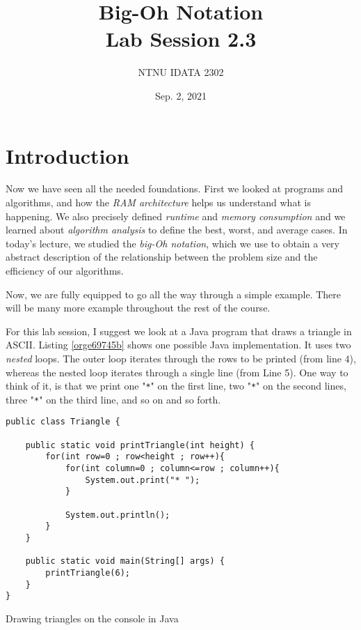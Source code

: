 \documentclass[11pt]{article}
\author{NTNU IDATA 2302}
\date{Sep. 2, 2021}
\title{Big-Oh Notation\\\medskip
\large Lab Session 2.3}
\begin{document}
\maketitle
\tableofcontents


\section{Introduction}
\label{sec:org06c48dc}

Now we have seen all the needed foundations. First we looked at
programs and algorithms, and how the \emph{RAM architecture} helps us
understand what is happening. We also precisely defined \emph{runtime} and
\emph{memory consumption} and we learned about \emph{algorithm analysis} to
define the best, worst, and average cases. In today's lecture, we
studied the \emph{big-Oh notation}, which we use to obtain a very abstract
description of the relationship between the problem size and the
efficiency of our algorithms.

Now, we are fully equipped to go all the way through a simple
example. There will be many more example throughout the rest of the
course.

For this lab session, I suggest we look at a Java program that draws a
triangle in ASCII. Listing \ref{orge69745b} shows one possible Java
implementation. It uses two \emph{nested} loops. The outer loop iterates
through the rows to be printed (from line 4), whereas the nested
loop iterates through a single line (from Line 5). One way to
think of it, is that we print one "\texttt{*}" on the first line, two "\texttt{*}"
on the second lines, three "\texttt{*}" on the third line, and so on and so
forth.

\begin{listing}[htbp]
\begin{verbatim}
public class Triangle {

    public static void printTriangle(int height) {
        for(int row=0 ; row<height ; row++){
            for(int column=0 ; column<=row ; column++){
                System.out.print("* ");  
            }  

            System.out.println();
        } 
    }

    public static void main(String[] args) {  
        printTriangle(6);
    }  
}  
\end{verbatim}
\caption{\label{orge69745b}Drawing triangles on the console in Java}
\end{listing}
\end{document}
